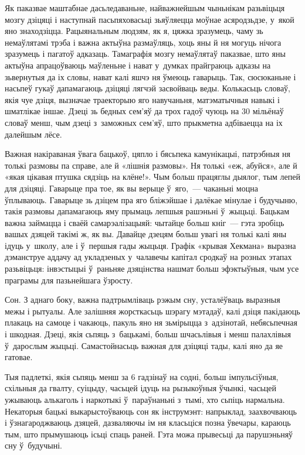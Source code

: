 Як паказвае маштабнае дасьледаваньне, найважнейшым чыньнікам разьвіцьця мозгу дзіцяці і наступнай пасьпяховасьці зьяўляецца моўнае асяродзьдзе, у~якой яно знаходзіцца. Рацыянальным людзям, як я, цяжка зразумець, чаму зь немаўлятамі трэба і важна актыўна размаўляць, хоць яны й ня могуць нічога зразумець і пагатоў адказаць. Тамаграфія мозгу немаўлятаў паказвае, што яны актыўна апрацоўваюць маўленьне і нават у~думках прайграюць адказы на зьвернутыя да іх словы, нават калі яшчэ ня ўмеюць гаварыць. Так, сюсюканьне і насьпеў гукаў дапамагаюць дзіцяці лягчэй засвойваць веды. Колькасьць словаў, якія чуе дзіця, вызначае траекторыю яго навучаньня, матэматычныя навыкі і шматлікае іншае. Дзеці зь бедных сем'яў да трох гадоў чуюць на 30 мільёнаў словаў менш, чым дзеці з~заможных сем'яў, што прыкметна адбіваецца на іх далейшым лёсе.

Важная накіраваная ўвага бацькоў, цяпло і бясьпека камунікацыі, патрэбныя ня толькі размовы па справе, але й «лішнія размовы». Ня толькі «еж, абуйся», але й «якая цікавая птушка сядзіць на клёне!». Чым больш працяглы дыялог, тым лепей для дзіцяці. Гаварыце пра тое, як вы верыце ў~яго,~--- чаканьні моцна ўплываюць. Гаварыце зь дзіцем пра яго бліжэйшае і далёкае мінулае і будучыню, такія размовы дапамагаюць яму прымаць лепшыя рашэньні ў~жыцьці. Бацькам важна займацца і сваёй самарэалізацыяй: чытайце больш кніг~--- гэта зробіць вашых дзяцей такімі ж, як вы. Давайце дзецям больш увагі ня толькі калі яны ідуць у~школу, але і ў~першыя гады жыцьця. Графік «крывая Хекмана» выразна дэманструе аддачу ад укладзеных у~чалавечы капітал сродкаў на розных этапах разьвіцьця: інвэстыцыі ў~раньняе дзяцінства нашмат больш эфэктыўныя, чым усе праграмы для пазьнейшага ўзросту.

Сон. З аднаго боку, важна падтрымліваць рэжым сну, усталёўваць выразныя межы і рытуалы. Але залішняя жорсткасьць шэрагу мэтадаў, калі дзіця пакідаюць плакаць на самоце і чакаюць, пакуль яно ня зьмірыцца з~адзінотай, небясьпечная і шкодная. Дзеці, якія сьпяць з~бацькамі, больш шчасьлівыя і менш палахлівыя ў~дарослым жыцьці. Самастойнасьць важная для дзіцяці тады, калі яно да яе гатовае.

Тыя падлеткі, якія сьпяць менш за 6 гадзінаў на содні, больш імпульсіўныя, схільныя да гвалту, суіцыду, часьцей ідуць на рызыкоўныя ўчынкі, часьцей ужываюць алькаголь і наркотыкі ў~параўнаньні з~тымі, хто сьпіць нармальна. Некаторыя бацькі выкарыстоўваюць сон як інструмэнт: напрыклад, заахвочваюць і ўзнагароджваюць дзяцей, дазваляючы ім ня класьціся позна ўвечары, караюць тым, што прымушаюць ісьці спаць раней. Гэта можа прывесьці да парушэньняў сну ў~будучыні.

